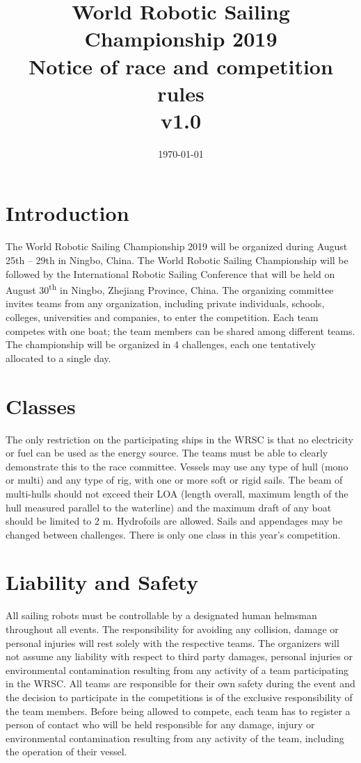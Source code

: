 \documentclass[12pt]{article}
\title{World Robotic Sailing Championship 2019 \\
Notice of race and competition rules \\v1.0}
\date{\today}
\begin{document}
\maketitle

\section{Introduction}

The World Robotic Sailing Championship 2019 will be organized during August 25th – 29th in Ningbo, China.
The World Robotic Sailing Championship will be followed by the International Robotic Sailing Conference that will be held on August 30\textsuperscript{th} in Ningbo, Zhejiang Province, China.
The organizing committee invites teams from any organization, including private individuals, schools, colleges, universities and companies, to enter the competition.
Each team competes with one boat; the team members can be shared among different teams.
The championship will be organized in 4 challenges, each one tentatively allocated to a single day. 


\section{Classes}

The only restriction on the participating ships in the WRSC is that no electricity or fuel can be used as the energy source.
The teams must be able to clearly demonstrate this to the race committee.
Vessels may use any type of hull (mono or multi) and any type of rig, with one or more soft or rigid sails.
The beam of multi-hulls should not exceed their LOA (length overall, maximum length of the hull measured parallel to the waterline) and the maximum draft of any boat should be limited to 2 m.
Hydrofoils are allowed. 
Sails and appendages may be changed between challenges. 
There is only one class in this year's competition. 

\section{Liability and Safety}
All sailing robots must be controllable by a designated human helmsman
throughout all events. The responsibility for avoiding any collision, 
damage or personal injuries will rest solely with the respective teams. 
The organizers will not assume any liability with respect to third party
damages, personal injuries or environmental contamination resulting from any
activity of a team participating in the WRSC. All teams are responsible for 
their own safety during the event and the decision to participate in the 
competitions is of the exclusive responsibility of the team members.
Before being allowed to compete, each team has to register a person of contact
who will be held responsible for any damage, injury or environmental
contamination resulting from any activity of the team, including the 
operation of their vessel.
\end{document}
